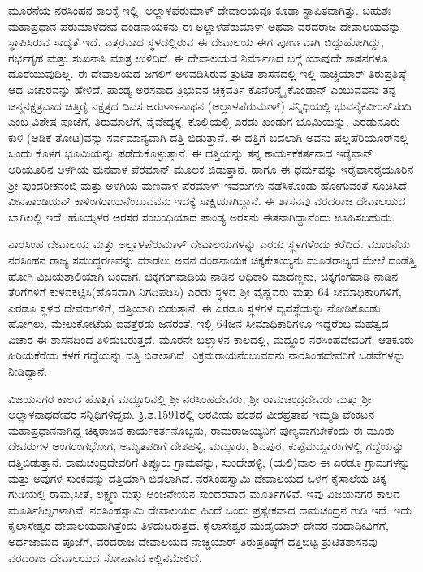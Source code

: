 ಮೂರನೆಯ ನರಸಿಂಹನ ಕಾಲಕ್ಕೆ ಇಲ್ಲಿ, ಅಲ್ಲಾಳಪೆರುಮಾಳ್​ ದೇವಾಲಯವೂ ಕೂಡಾ ಸ್ಥಾಪಿತವಾಗಿತ್ತು. ಬಹುಶಃ ಮಹಾಪ್ರಧಾನ ಪೆರುಮಾಳೆದೇವ ದಂಡನಾಯಕನು ಈ ಅಲ್ಲಾಳಪೆರುಮಾಳ್​ ಅಥವಾ ವರದರಾಜ ದೇವಾಲಯವನ್ನು ಸ್ಥಾಪಿಸಿರುವ ಸಾಧ್ಯತೆ ಇದೆ. ಎತ್ತರವಾದ ಸ್ಥಳದಲ್ಲಿರುವ ಈ ದೇವಾಲಯ ಈಗ ಪೂರ್ಣವಾಗಿ ಬಿದ್ದುಹೋಗಿದ್ದು, ಗರ್ಭಗೃಹ ಮತ್ತು ಸುಖನಾಸಿ ಮಾತ್ರ ಉಳಿದಿದೆ. ಈ ದೇವಾಲಯದ ನಿರ್ಮಾಣದ ಬಗ್ಗೆ ಯಾವುದೇ ಶಾಸನಗಳೂ ದೊರೆಯುವುದಿಲ್ಲ. ಈ ದೇವಾಲಯದ ಜಗಲಿಗೆ ಅಳವಡಿಸಿರುವ ತ್ರುಟಿತ ಶಾಸನದಲ್ಲಿ ಇಲ್ಲಿ ನಾಚ್ಚಿಯಾರ್​ ತಿರುಪ್ರತಿಷ್ಠೆ ಆದ ವಿಚಾರವನ್ನು ಹೇಳಿದೆ. ಪಾಂಡ್ಯ ಅರಸನಾದ ತ್ರಿಭುವನ ಚಕ್ರವರ್ತಿ ಕೊನೆರಿನ್ಮೈ ಕೊಂಡಾನ್​ ಎಂಬುವವನು ತನ್ನ ಜನ್ಮನಕ್ಷತ್ರವಾದ ಚಿತ್ತಿರೈ ನಕ್ಷತ್ರದ ದಿವಸ ಅರುಳಾಳನಾಥನ (ಅಲ್ಲಾಳಪೆರುಮಾಳ್​) ಸನ್ನಿಧಿಯಲ್ಲಿ ಭುವನೈಕವೀರನ್​ ಸಂದಿ ಎಂಬ ವಿಶೇಷ ಪೂಜೆಗೆ, ತಿರುಮಾಲೆಗೆ, ನೈವೇದ್ಯಕ್ಕೆ, ಕೊಲ್ಲಿಯಲ್ಲಿ ಎರಡು ಖಂಡುಗ ಭೂಮಿಯನ್ನು, ಎರಡುನೂರು ಕುಳಿ (ಅಡಿಕೆ ತೋಟ)ವನ್ನು ಸರ್ವಮಾನ್ಯವಾಗಿ ದತ್ತಿ ಬಿಡುತ್ತಾನೆ. ಈ ದತ್ತಿಗೆ ಬದಲಾಗಿ ಅವನು ಪಲ್ಲಪೆರಿಯೂರ್​ನಲ್ಲಿ ಒಂದು ಕೊಳಗ ಭೂಮಿಯನ್ನು ಪಡೆದುಕೊಳ್ಳುತ್ತಾನೆ. ಈ ದತ್ತಿಯನ್ನು ತನ್ನ ಕಾರ್ಯಕೆಕರ್ತನಾದ ಇರೈವಾನ್​ ಅರಿಯೂರಿನ ಅಳಗಿಯ ಮನವಾಳ ಪೆರಮಾನ್​ ಮೂಲಕ ಬಿಡುತ್ತಾನೆ. ಹಾಗೂ ಈ ಧರ್ಮವನ್ನು ಇರೈವಾನರೈಯೂರಿನ ಶ‍್ರೀ ಪುಂಡರೀಕನಂಬಿ ಮತ್ತು ಅಳಗಿಯ ಮಣವಾಳ ಪೆರಮಾಳ್​ ಇವರುಗಳು ನಡೆಸಿಕೊಂಡು ಹೋಗುವಂತೆ ಸೂಚಿಸಿದೆ. ವೀನಪಾಂಡಿಯನ್​ ಕಾಳಿಂಗರಾಯನೆಂಬುವವನು ಇದಕ್ಕೆ ಸಾಕ್ಷಿಯಾಗಿದ್ದಾನೆ. ಈ ಶಾಸನವು ವರದರಾಜ ದೇವಾಲಯದ ಬಾಗಿಲಲ್ಲಿ ಇದೆ. ಹೊಯ್ಸಳರ ಅರಸರ ಸಂಬಂಧಿಯಾದ ಪಾಂಡ್ಯ ಅರಸನು ಈತನಾಗಿದ್ದಾನೆಂದು ಊಹಿಸಬಹುದು.

ನಾರಸಿಂಹ ದೇವಾಲಯ ಮತ್ತು ಅಲ್ಲಾಳಪೆರುಮಾಳ್​ ದೇವಾಲಯಗಳನ್ನು ಎರಡು ಸ್ಥಳಗಳೆಂದು ಕರೆದಿದೆ. ಮೂರನೆಯ ನರಸಿಂಹನ ರಾಜ್ಯ ಸಮುದ್ಧರಣವನ್ನು ಮಾಡಲು ಅವನ ದಂಡನಾಯಕ ಚಿಕ್ಕಕೇತಯ್ಯನು ಮೂಡರಾಜ್ಯದ ಮೇಲೆ ದಂಡೆತ್ತಿ ಹೋಗಿ ವಿಜಯಶಾಲಿಯಾಗಿ ಬಂದಾಗ, ಚಿಕ್ಕಗಂಗವಾಡಿಯ ನಾಡಿನ ಅಧಿಕಾರಿ ಮಾದಣ್ಣನು, ಚಿಕ್ಕಗಂಗವಾಡಿ ನಾಡಿನ ತೆರಿಗೆಗಳಿಗೆ ಕುಳವಕಟ್ಟಿಸಿ(ಹೊಸದಾಗಿ ನಿಗದಿಪಡಿಸಿ) ಎರಡು ಸ್ಥಳದ ಶ‍್ರೀ ವೈಷ್ಣವರು ಮತ್ತು 64 ಸೀಮಾಧಿಕಾರಿಗಳಿಗೆ, ಎರಡೂ ಸ್ಥಳದ ದೇವರುಗಳಿಗೆ, ದತ್ತಿಯಾಗಿ ಬಿಡುತ್ತಾನೆ. ಈ ಎರಡೂ ಸ್ಥಳಗಳ ವ್ಯವಸ್ಥೆಯನ್ನು ನೋಡಿಕೊಂಡು ಹೋಗಲು, ಮೇಲುಕೋಟೆಯ ಐವತ್ತೆರಡು ಜನರಂತೆ, ಇಲ್ಲಿ 64ಜನ ಸೀಮಾಧಿಕಾರಿಗಳೂ ಇದ್ದರೆಂಬ ಮಹತ್ವದ ವಿಚಾರ ಈ ಶಾಸನದಿಂದ ತಿಳಿದುಬರುತ್ತದೆ. ಮೂರನೇ ಬಲ್ಲಾಳನ ಕಾಲದಲ್ಲಿ, ಮದ್ದೂರ ನರಸಿಂಹದೇವರಿಗೆ, ಆತಕೂರು ಹಿರಿಯಕೆರೆಯ ಕೆಳಗೆ ಗದ್ದೆಯನ್ನು ದತ್ತಿ ಬಿಡಲಾಗಿದೆ. ವಿಕ್ರಮರಾಯನೆಂಬುವವನು ನಾರಸಿಂಹದೇವರಿಗೆ ಒಡವೆಗಳನ್ನು ನೀಡಿದ್ದಾನೆ.

ವಿಜಯನಗರ ಕಾಲದ ಹೊತ್ತಿಗೆ ಮದ್ದೂರಿನಲ್ಲಿ ಶ‍್ರೀ ನರಸಿಂಹದೇವರು, ಶ‍್ರೀ ರಾಮಚಂದ್ರದೇವರು ಮತ್ತು ಶ‍್ರೀ ಅಲ್ಲಾಳನಾಥದೇವರ ಸನ್ನಿಧಿಗಳಿದ್ದವು. ಕ್ರಿ.ಶ.1591ರಲ್ಲಿ ಅರವೀಡು ವಂಶದ ವೀರಪ್ರತಾಪ ಇಮ್ಮಡಿ ವೆಂಕಟನ ಮಹಾಪ್ರಧಾನನಾಗಿದ್ದ ಚಿಕ್ಕರಾಜನ ಕಾರ್ಯಕರ್ತನೊಬ್ಬನು, ರಾಮರಾಜಯ್ಯನಿಗೆ ಪುಣ್ಯವಾಗಬೇಕೆಂದು ಈ ಮೂರು ದೇವರುಗಳ ಅಂಗರಂಗಭೋಗ, ಅಮೃತಪಡಿಗೆ ದೇಶಹಳ್ಳಿ, ಮದ್ದೂರು, ಶಿವಪುರ, ಕುಪ್ಪೆಮದ್ದೂರುಗಳಲ್ಲಿ ಗದ್ದೆಯನ್ನು ದತ್ತಿಬಿಡುತ್ತಾನೆ. ರಾಮಚಂದ್ರದೇವರಿಗೆ ತಿಪ್ಪೂರು ಗ್ರಾಮವನ್ನು, ಸುಂದೇಹಳ್ಳಿ, (ಯಲಿ)ವಾಲ ಈ ಎರಡೂ ಗ್ರಾಮಗಳನ್ನು ಮತ್ತು ಅವುಗಳ ಸುಂಕವನ್ನು ದತ್ತಿಯಾಗಿ ಬಿಡಲಾಗಿದೆ. ನರಸಿಂಹಸ್ವಾಮಿ ದೇವಾಲಯದ ಒಳಗೆ ಕೈಸಾಲೆಯ ಚಿಕ್ಕ ಗುಡಿಯಲ್ಲಿ ರಾಮ,ಸೀತೆ, ಲಕ್ಷ್ಮಣ ಮತ್ತು ಆಂಜನೇಯನ ಸುಂದರವಾದ ಮೂರ್ತಿಗಳಿವೆ. ಇವು ವಿಜಯನಗರ ಕಾಲದ ಮೂರ್ತಿಶಿಲ್ಪಗಳಾಗಿವೆ. ನರಸಿಂಹಸ್ವಾಮಿ ದೇವಾಲಯದ ಹಿಂದೆ ಒಂದು ಪ್ರತ್ಯೇಕವಾದ ರಾಮಚಂದ್ರನ ಗುಡಿ ಇದೆ. ಇದು ಕೈಲಾಸೇಶ್ವರ ದೇವಾಲಯವಾಗಿತ್ತೆಂದು ತಿಳಿದುಬರುತ್ತದೆ. ಕೈಲಾಸೇಶ್ವರ ಮುಡೈಯಾರ್​ ದೇವರ ನಂದಾದೀವಿಗೆಗೆ, ಅರ್ಧಜಾಮದ ಪೂಜೆಗೆ, ವರದರಾಜ ದೇವಾಲಯದ ನಾಚ್ಚಿಯಾರ್​ ತಿರುಪ್ರತಿಷ್ಠೆಗೆ ದತ್ತಿಬಿಟ್ಟ ತ್ರುಟಿತಶಾಸನವು ವರದರಾಜ ದೇವಾಲಯದ ಸೋಪಾನದ ಕಲ್ಲಿನಮೇಲಿದೆ.

